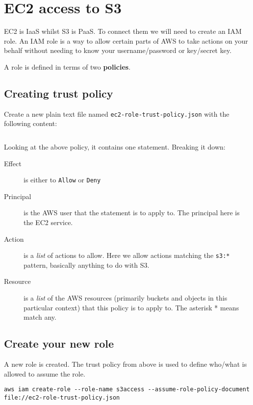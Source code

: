 
\section{EC2 access to S3}
\label{sec:ec2-access-to-s3}

EC2 is IaaS whilst S3 is PaaS.
To connect them we will need to create an IAM role.
An IAM role is a way to allow certain parts of AWS to take actions on your behalf without needing to know your username/password or key/secret key. 

A role is defined in terms of two \textbf{policies}.

\subsection{Creating trust policy}

Create a new plain text file named \texttt{ec2-role-trust-policy.json} with the following content:

\inputminted{json}{ec2-role-trust-policy.json}

Looking at the above policy, it contains one statement. Breaking it down:
\begin{description}
\item[Effect] is either to \texttt{Allow} or \texttt{Deny}
\item[Principal] is the AWS user that the statement is to apply to. The principal here is the EC2 service. 
\item[Action] is a \textit{list} of actions to allow.  Here we allow actions matching the \texttt{s3:*} pattern, basically anything to do with S3.
\item[Resource] is a \textit{list} of the AWS resources (primarily buckets and objects in this particular context) that this policy is to apply to. The asterisk * means match any.
\end{description}


\subsection{Create your new role}

A new role is created.
The trust policy from above is used to define who/what is allowed to assume the role. 

\begin{verbatim}
aws iam create-role --role-name s3access --assume-role-policy-document file://ec2-role-trust-policy.json
\end{verbatim}

